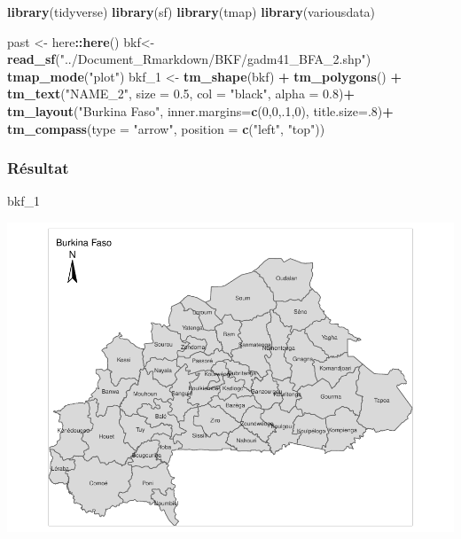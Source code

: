 \documentclass[
  12pt,
]{article}
\newenvironment{Shaded}{\begin{snugshade}}{\end{snugshade}}
\newcommand{\AttributeTok}[1]{\textcolor[rgb]{0.13,0.29,0.53}{#1}}
\newcommand{\DecValTok}[1]{\textcolor[rgb]{0.00,0.00,0.81}{#1}}
\newcommand{\FloatTok}[1]{\textcolor[rgb]{0.00,0.00,0.81}{#1}}
\newcommand{\FunctionTok}[1]{\textcolor[rgb]{0.13,0.29,0.53}{\textbf{#1}}}
\newcommand{\NormalTok}[1]{#1}
\newcommand{\OtherTok}[1]{\textcolor[rgb]{0.56,0.35,0.01}{#1}}
\newcommand{\SpecialCharTok}[1]{\textcolor[rgb]{0.81,0.36,0.00}{\textbf{#1}}}
\newcommand{\StringTok}[1]{\textcolor[rgb]{0.31,0.60,0.02}{#1}}
\begin{document}
\begin{Shaded}
\begin{Highlighting}[]
\FunctionTok{library}\NormalTok{(tidyverse)}
\FunctionTok{library}\NormalTok{(sf)}
\FunctionTok{library}\NormalTok{(tmap)}
\FunctionTok{library}\NormalTok{(variousdata)}

\NormalTok{past }\OtherTok{\textless{}{-}}\NormalTok{ here}\SpecialCharTok{::}\FunctionTok{here}\NormalTok{()}
\NormalTok{bkf}\OtherTok{\textless{}{-}} \FunctionTok{read\_sf}\NormalTok{(}\StringTok{"../Document\_Rmarkdown/BKF/gadm41\_BFA\_2.shp"}\NormalTok{)}
\FunctionTok{tmap\_mode}\NormalTok{(}\StringTok{"plot"}\NormalTok{)}
\NormalTok{bkf\_1 }\OtherTok{\textless{}{-}} \FunctionTok{tm\_shape}\NormalTok{(bkf) }\SpecialCharTok{+} 
    \FunctionTok{tm\_polygons}\NormalTok{() }\SpecialCharTok{+} 
   \FunctionTok{tm\_text}\NormalTok{(}\StringTok{"NAME\_2"}\NormalTok{, }\AttributeTok{size =} \FloatTok{0.5}\NormalTok{, }\AttributeTok{col =} \StringTok{"black"}\NormalTok{, }\AttributeTok{alpha =} \FloatTok{0.8}\NormalTok{)}\SpecialCharTok{+}
  \FunctionTok{tm\_layout}\NormalTok{(}\StringTok{"Burkina Faso"}\NormalTok{, }\AttributeTok{inner.margins=}\FunctionTok{c}\NormalTok{(}\DecValTok{0}\NormalTok{,}\DecValTok{0}\NormalTok{,.}\DecValTok{1}\NormalTok{,}\DecValTok{0}\NormalTok{), }\AttributeTok{title.size=}\NormalTok{.}\DecValTok{8}\NormalTok{)}\SpecialCharTok{+}
  \FunctionTok{tm\_compass}\NormalTok{(}\AttributeTok{type =} \StringTok{"arrow"}\NormalTok{, }\AttributeTok{position =} \FunctionTok{c}\NormalTok{(}\StringTok{"left"}\NormalTok{, }\StringTok{"top"}\NormalTok{)) }
\end{Highlighting}
\end{Shaded}

\subsubsection{Résultat}\label{ruxe9sultat-2}

\begin{Shaded}
\begin{Highlighting}[]
\NormalTok{bkf\_1}
\end{Highlighting}
\end{Shaded}

\includegraphics{Document_RMD_GRP5_files/figure-latex/spatial-1.pdf}
\end{document}
